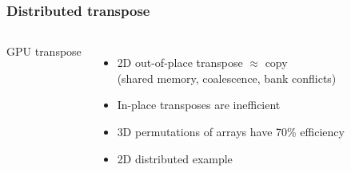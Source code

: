 \documentclass{beamer}
\begin{document}
\begin{frame}
\frametitle{Distributed transpose}
\begin{columns}
GPU transpose
\begin{itemize}
\item 2D out-of-place transpose $\approx$ copy \\
      \small{(shared memory, coalescence, bank conflicts)}
\item In-place transposes are inefficient
\item 3D permutations of arrays have 70\% efficiency
\item 2D distributed example
\end{itemize}



\end{columns}
\end{frame}
\end{document}

